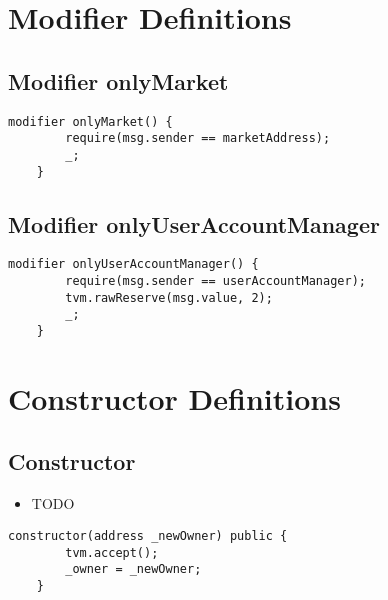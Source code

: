 \section{Modifier Definitions}


\subsection{Modifier onlyMarket}


\begin{lstlisting}[firstnumber=135]
    modifier onlyMarket() {
        require(msg.sender == marketAddress);
        _;
    }
\end{lstlisting}

\subsection{Modifier onlyUserAccountManager}


\begin{lstlisting}[firstnumber=140]
    modifier onlyUserAccountManager() {
        require(msg.sender == userAccountManager);
        tvm.rawReserve(msg.value, 2);
        _;
    }
\end{lstlisting}

\section{Constructor Definitions}


\subsection{Constructor}

\noindent\begin{itemize}
\item TODO
\end{itemize}

\begin{lstlisting}[firstnumber=21]
    constructor(address _newOwner) public {
        tvm.accept();
        _owner = _newOwner;
    }
\end{lstlisting}

